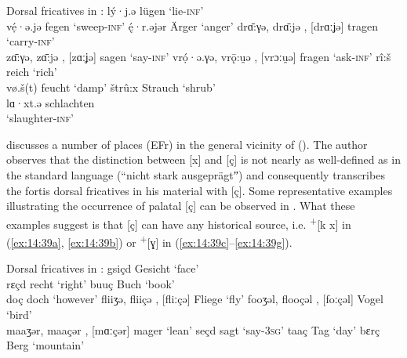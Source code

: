 \ea%
\label{ex:14:38}Dorsal fricatives in :
\ea\label{ex:14:38a} lý·j.ə \tab [lyʝə]  \tab  lügen \tab ‘lie\textsc{{}-inf}’ \\
    vẹ́·ə.jə \tab [veəʝə]  \tab  fegen \tab ‘sweep\textsc{{}-inf}’ 
\ex\label{ex:14:38b} \'{ę}·r.əjər \tab [ɛrəʝər]  \tab  Ärger \tab ‘anger’ 
\ex\label{ex:14:38c} dr\={ɑ}:γə, dr\={ɑ}:jə \tab  [drɑːɣə], [drɑːʝə]  \tab   tragen \tab ‘carry\textsc{{}-inf}’ \\
    z\={ɑ}:γə, z\={ɑ}:jə \tab  [zɑːɣə], [zɑːʝə]  \tab   sagen \tab ‘say\textsc{{}-inf}’ 
\ex\label{ex:14:38d} vr\d{ó}·ə.γə, vrǭ:u̯ə  \tab  [vroəɣə], [vrɔːu̯ə]  \tab  fragen \tab ‘ask\textsc{{}-inf}’ 
\ex\label{ex:14:38e} rî:š \tab  [riːɕ]  \tab  reich \tab ‘rich’ \\
    vø.š(t) \tab [vøɕt]  \tab  feucht \tab ‘damp’ 
\ex\label{ex:14:38f} štrû:x \tab [ʃtruːx]  \tab  Strauch \tab ‘shrub’ \\
    lɑ·xt.ə \tab [ʃlɑxtə]  \tab  schlachten\\
    \tab \tab \tab ‘slaughter\textsc{{}-inf}’ 
    \z 
\z

\citet{Braun1906} discusses a number of places (EFr) in the general vicinity of  (). The author observes that the distinction between [x] and [ç] is not nearly as well-defined as in the standard language (“nicht stark ausgeprägtˮ) and consequently transcribes the fortis dorsal fricatives in his material with [ç]. Some representative examples illustrating the occurrence of palatal [ç] can be observed in . What these examples suggest is that [ç] can have any historical source, i.e.  \textsuperscript{+}[k x] in (\ref{ex:14:39a}, \ref{ex:14:39b}) or  \textsuperscript{+}[ɣ] in (\ref{ex:14:39c}--\ref{ex:14:39g}).\pagebreak

\ea%
\label{ex:14:39}Dorsal fricatives in :
\ea\label{ex:14:39a} gsiçd \tab [gsiçt]  \tab  Gesicht \tab ‘face’ \\
    rɛçd \tab [rɛçt]  \tab  recht \tab ‘right’ 
\ex\label{ex:14:39b} buuç \tab [buːç]  \tab  Buch \tab ‘book’ \\
    doç \tab [doç]  \tab  doch \tab ‘however’ 
\ex\label{ex:14:39c} fliiʒə, fliiçə \tab [fliːɣə], [fliːçə] \tab Fliege \tab ‘fly’ 
\ex\label{ex:14:39d} fooʒəl, flooçəl \tab  [foːɣəl], [foːçəl]  \tab   Vogel \tab ‘bird’ \\
    maaʒər, maaçər \tab [mɑːɣər], [mɑːçər]  \tab  mager \tab ‘lean’ 
\ex\label{ex:14:39e} seçd \tab [seçt]  \tab  sagt \tab ‘say\textsc{{}-3sg}’ 
\ex\label{ex:14:39f} taaç  \tab  [tɑːç]  \tab  Tag \tab ‘day’ 
\ex\label{ex:14:39g} bɛrç \tab [bɛrç]  \tab  Berg \tab ‘mountain’ 
    \z
\z 

